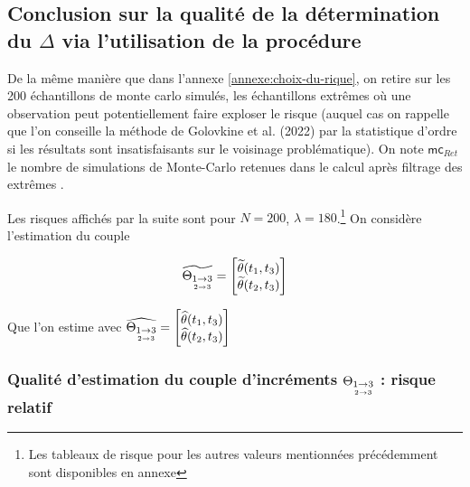 

\subsection{Conclusion sur la qualité de la détermination du $\Delta$ via l'utilisation de la procédure}

\noindent De la même manière que dans l'annexe \ref{annexe:choix-du-rique}, on retire sur les 200 échantillons de monte carlo simulés, les échantillons \og extrêmes \fg où une observation peut potentiellement faire exploser le risque (auquel cas on rappelle que l'on conseille la méthode de Golovkine et al. (2022) par la statistique d'ordre si les résultats sont insatisfaisants sur le voisinage problématique). On note $\textsf{mc}_{Ret}$ le nombre de simulations de Monte-Carlo retenues dans le calcul après filtrage des \og extrêmes \fg.

\bigskip

\noindent Les risques affichés par la suite sont pour $N=200$, $\lambda = 180$.\footnote{Les tableaux de risque pour les autres valeurs mentionnées précédemment sont disponibles en annexe} On considère l'estimation du couple

\begin{minipage}{0.45\textwidth}
	\begin{equation*}
		\widetilde {\Theta_{\underset{2 \rightarrow 3}{1 \rightarrow 3}}} = \begin{bmatrix} \widetilde \theta(t_1, t_3)\\ \widetilde \theta(t_2, t_3) \end{bmatrix}
	\end{equation*}
\end{minipage}
\begin{minipage}{0.45\textwidth}
	Que l'on estime avec $\widehat {\Theta_{\underset{2 \rightarrow 3}{1 \rightarrow 3}}} = \begin{bmatrix} \widehat \theta(t_1, t_3)\\ \widehat \theta(t_2, t_3) \end{bmatrix}$
\end{minipage}

\bigskip

\subsubsection{Qualité d'estimation du couple d'incréments $\Theta_{\underset{2 \rightarrow 3}{1 \rightarrow 3}}$ : risque relatif}

